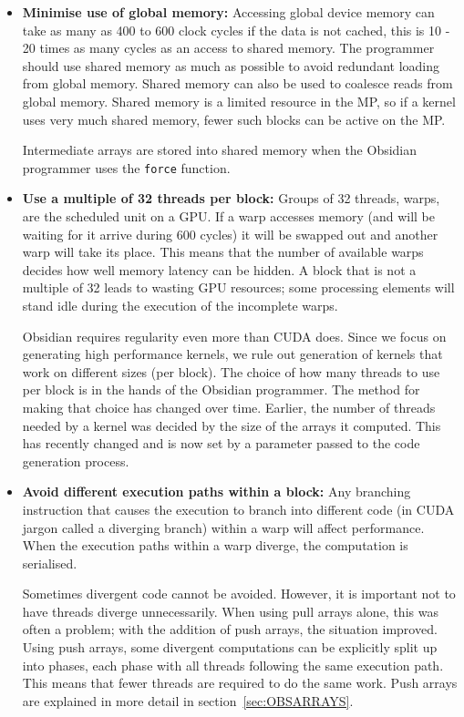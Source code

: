 \documentclass[a4paper]{book}
\begin{document}
\begin{itemize}
\item {\bf Minimise use of global memory:} Accessing global device memory can take as 
many as 400 to 600 clock cycles if the data is not cached, this is 10 - 20 times as many cycles 
as an access to shared memory. The programmer should use shared memory as much as possible 
to avoid redundant loading from global memory. Shared memory can also be used to coalesce 
reads from global memory. Shared memory is a limited resource in the MP, so if a kernel 
uses very much shared memory, fewer such blocks can be active on the MP. 

Intermediate arrays are stored into shared memory when the Obsidian programmer uses 
the {\tt force} function. 

\item {\bf Use a multiple of 32 threads per block:} Groups of 32 threads, warps, are the 
scheduled unit on a GPU. If a warp accesses memory (and will be waiting for it arrive during 
600 cycles) it will be swapped out and another warp will take its place. This means that 
the number of available warps decides how well memory latency can be hidden. A block that is 
not a multiple of 32 leads to wasting GPU resources; some processing elements will stand 
idle during the execution of the incomplete warps. 

Obsidian requires regularity even more than CUDA does. Since we focus on generating high 
performance kernels, we rule out generation of kernels that work on different sizes (per block). 
The choice of how many threads to use per block is in the hands of the Obsidian programmer.
The method for making that choice has changed over time. Earlier, the number of threads 
needed by a kernel was decided by the size of the arrays it computed. This has recently changed
and is now set by a parameter passed to the code generation process.  

\item {\bf Avoid different execution paths within a block:} Any branching instruction that 
causes the execution to branch into different code (in CUDA jargon called a diverging branch) 
within a warp will affect performance. When the execution paths within a warp diverge, the 
computation is serialised. 

Sometimes divergent code cannot be avoided. However, it is important not to have threads 
diverge unnecessarily. When using pull arrays alone, this was often a problem; with the 
addition of push arrays, the situation improved. Using push arrays, some divergent computations 
can be explicitly split up into phases, each phase with all threads following the 
same execution path. This means that fewer threads are required to do the same work. Push arrays 
are explained in more detail in section~\ref{sec:OBSARRAYS}. 


\end{itemize}
\end{document}
